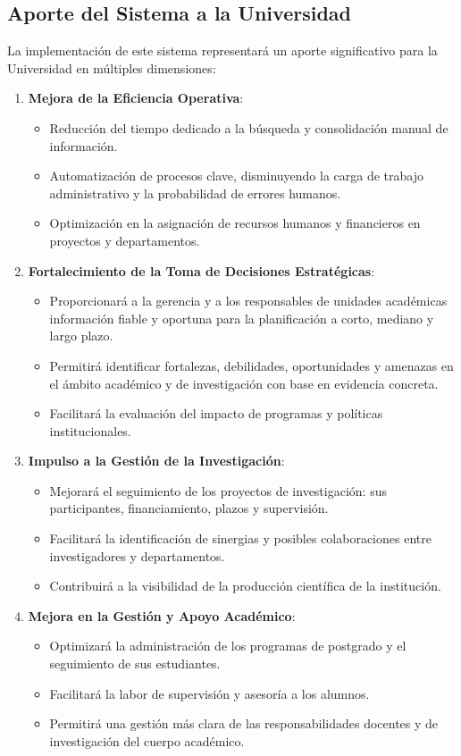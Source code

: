 \subsection{Aporte del Sistema a la Universidad}
La implementación de este sistema representará un aporte significativo para la Universidad en múltiples dimensiones:
\begin{enumerate}
    \item \textbf{Mejora de la Eficiencia Operativa}:
\begin{itemize}
    \item Reducción del tiempo dedicado a la búsqueda y consolidación manual de información.
\item Automatización de procesos clave, disminuyendo la carga de trabajo administrativo y la probabilidad de errores humanos.
\item Optimización en la asignación de recursos humanos y financieros en proyectos y departamentos.
\end{itemize}
\item \textbf{Fortalecimiento de la Toma de Decisiones Estratégicas}:
\begin{itemize}
\item Proporcionará a la gerencia y a los responsables de unidades académicas información fiable y oportuna para la planificación a corto, mediano y largo plazo.
\item Permitirá identificar fortalezas, debilidades, oportunidades y amenazas en el ámbito académico y de investigación con base en evidencia concreta.
 \item Facilitará la evaluación del impacto de programas y políticas institucionales.
 \end{itemize}
 \item \textbf{Impulso a la Gestión de la Investigación}:
\begin{itemize}
\item Mejorará el seguimiento de los proyectos de investigación: sus participantes, financiamiento, plazos y supervisión.
\item Facilitará la identificación de sinergias y posibles colaboraciones entre investigadores y departamentos.
\item Contribuirá a la visibilidad de la producción científica de la institución.
\end{itemize}
 \item \textbf{Mejora en la Gestión y Apoyo Académico}:
\begin{itemize}
    \item Optimizará la administración de los programas de postgrado y el seguimiento de sus estudiantes.
\item Facilitará la labor de supervisión y asesoría a los alumnos.
\item Permitirá una gestión más clara de las responsabilidades docentes y de investigación del cuerpo académico.
\end{itemize}


\end{enumerate}
